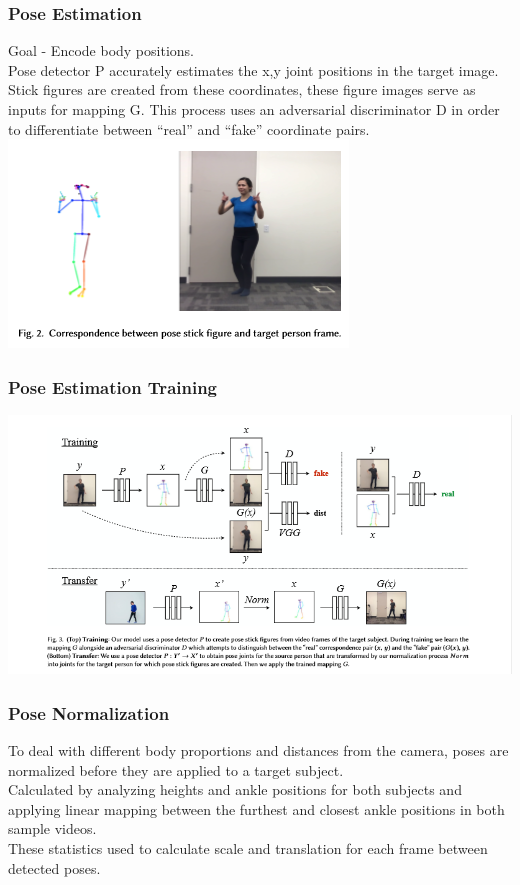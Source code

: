 \documentclass{beamer}
\begin{document}
    \begin{frame}
        \frametitle{Pose Estimation}
        Goal - Encode body positions. \\
        \vspace{0.2in}
        Pose detector P accurately estimates the x,y joint positions in the target image.\\
        \vspace{0.2in}
        Stick figures are created from these coordinates, these figure images serve as inputs for mapping G. This process uses an adversarial discriminator D in order to differentiate between “real” and “fake” coordinate pairs. \\
        \includegraphics[scale=.8]{images/figure_example.png}
    \end{frame}

    \begin{frame}
        \frametitle{Pose Estimation Training}
        \includegraphics[scale=.6]{images/training.png}
    \end{frame}

    

    \begin{frame}
        \frametitle{Pose Normalization}
        To deal with different body proportions and distances from the camera, poses are normalized before they are applied to a target subject. \\
        \vspace{0.2in}
        Calculated by analyzing heights and ankle positions for both subjects and applying linear mapping between the furthest and closest ankle positions in both sample videos.\\
        \vspace{0.2in}
        These statistics used to calculate scale and translation for each frame between detected poses.
    \end{frame}
\end{document}
